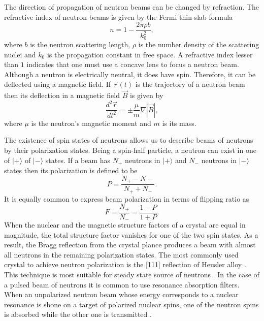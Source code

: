 \documentclass{article}
\numberwithin{equation}{section}
\begin{document}
The direction of propagation of neutron beams can be changed by refraction.
The refractive index of neutron beams is given by the Fermi thin-slab formula
\cite{warner1985neutron}
\begin{equation}\label{s7e3}
n = 1 - \frac{2\pi\rho b}{k_0^2},
\end{equation}
where $b$ is the neutron scattering length, $\rho$ is the number density of
the scattering nuclei and $k_0$ is the propagation constant in free space.
A refractive index lesser than $1$ indicates that one must use a concave lens
to focus a neutron beam. Although a neutron is electrically neutral, it does
have spin. Therefore, it can be deflected using a magnetic field. If 
$\vec{r}(t)$ is the trajectory of a neutron beam then its deflection in a
magnetic field $\vec{B}$ is given by
\begin{equation}\label{s7e4}
\frac{d^2\vec{r}}{dt^2} = \pm\frac{\mu}{m}\nabla|\vec{B}|,
\end{equation}
where $\mu$ is the neutron's magnetic moment and $m$ is its mass.

The existence of spin states of neutrons allows us to describe beams of 
neutrons by their polarization states. Being a spin-half particle, a neutron
can exist in one of $|+\rangle$ of $|-\rangle$ states. If a beam has $N_+$
neutrons in $|+\rangle$ and $N_-$ neutrons in $|-\rangle$ states then its
polarization is defined to be
\begin{equation}\label{s7e5}
P = \frac{N_+ - N-}{N_+ + N_-}.
\end{equation}
It is equally common to express beam polarization in terms of flipping ratio
as
\begin{equation}\label{s7e6}
F = \frac{N_+}{N_-} = \frac{1 - P}{1 + P}.
\end{equation}
When the nuclear and the magnetic structure factors of a crystal are equal in
magnitude, the total structure factor vanishes for one of the two spin states.
As a result, the Bragg reflection from the crystal plance produces a beam with
almost all neutrons in the remaining polarization states. The most commonly
used crystal to achieve neutron polarization is the [111] reflection of 
Heusler alloy \cite{anderson2008neutron}. This technique is most suitable for
steady state source of neutrons \cite{williams1988polarized}. In the case of
a pulsed beam of neutrons it is common to use resonance absorption filters.
When an unpolarized neutron beam whose energy corresponds to a nuclear
resonance is shone on a target of polarized nuclear spins, one of the 
neutron spins is absorbed while the other one is transmitted 
\cite{williams1988polarized}.
\end{document}
